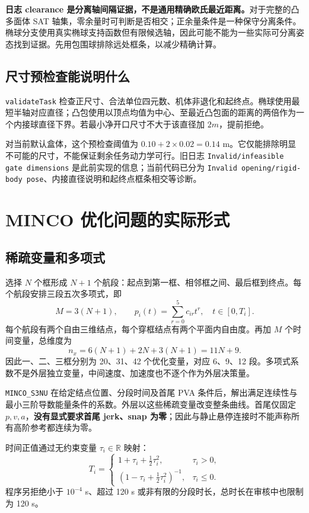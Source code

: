 \documentclass[UTF8,fontset=fandol,a4paper,10pt]{ctexart}
\newcommand{\code}[1]{{\small\nolinkurl{#1}}}
\newcommand{\R}{\mathbb R}
\begin{document}
\textbf{日志 clearance 是分离轴间隔证据，不是通用精确欧氏最近距离。}对于完整的凸多面体 SAT 轴集，零余量时可判断是否相交；正余量条件是一种保守分离条件。椭球分支使用真实椭球支持函数但有限候选轴，因此可能不能为一些实际可分离姿态找到证据。先用包围球排除远处框条，以减少精确计算。

\subsection{尺寸预检查能说明什么}
\code{validateTask} 检查正尺寸、合法单位四元数、机体非退化和起终点。椭球使用最短半轴对应直径；凸包使用以顶点均值为中心、至最近凸包面的距离的两倍作为一个内接球直径下界。若最小净开口尺寸不大于该直径加 $2m$，提前拒绝。

对当前默认盒体，这个预检查阈值为 $0.10+2\times0.02=0.14$ m。它仅能排除明显不可能的尺寸，不能保证剩余任务动力学可行。旧日志 \code{Invalid/infeasible gate dimensions} 是此前实现的信息；当前代码已分为 \code{Invalid opening/rigid-body pose}、内接直径说明和起终点框条相交等诊断。

\section{MINCO 优化问题的实际形式}\label{sec:optimization}
\subsection{稀疏变量和多项式}
选择 $N$ 个框形成 $N+1$ 个航段：起点到第一框、相邻框之间、最后框到终点。每个航段安排三段五次多项式，即
\[
 M=3(N+1),\qquad p_i(t)=\sum_{r=0}^{5}c_{ir}t^r,\quad t\in[0,T_i].
\]
每个航段有两个自由三维结点，每个穿框结点有两个平面内自由度。再加 $M$ 个时间变量，总维度为
\[
 n_x=6(N+1)+2N+3(N+1)=11N+9.
\]
因此一、二、三框分别为 20、31、42 个优化变量，对应 6、9、12 段。多项式系数不是外层独立变量，中间速度、加速度也不逐个作为外层决策量。

\code{MINCO_S3NU} 在给定结点位置、分段时间及首尾 PVA 条件后，解出满足连续性与最小三阶导数能量条件的系数。外层以这些稀疏变量改变整条曲线。首尾仅固定 $p,v,a$，\textbf{没有显式要求首尾 jerk、snap 为零}；因此与静止悬停连接时不能声称所有高阶参考都连续为零。

时间正值通过无约束变量 $\tau_i\in\R$ 映射：
\[
 T_i=\begin{cases}1+\tau_i+\tfrac12\tau_i^2,&\tau_i>0,\\
 (1-\tau_i+\tfrac12\tau_i^2)^{-1},&\tau_i\le0.\end{cases}
\]
程序另拒绝小于 $10^{-4}$ s、超过 120 s 或非有限的分段时长，总时长在审核中也限制为 120 s。
\end{document}
